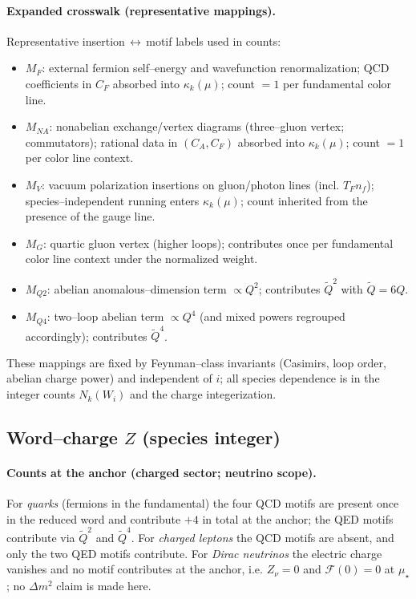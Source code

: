 \documentclass[epjc3]{svjour3}
\begin{document}
\paragraph{Expanded crosswalk (representative mappings).}
Representative insertion\,$\leftrightarrow$\,motif labels used in counts:
\begin{itemize}
  \item $M_F$: external fermion self--energy and wavefunction renormalization; QCD coefficients in $C_F$ absorbed into $\kappa_k(\mu)$; count $=1$ per fundamental color line.
  \item $M_{NA}$: nonabelian exchange/vertex diagrams (three--gluon vertex; commutators); rational data in $(C_A,C_F)$ absorbed into $\kappa_k(\mu)$; count $=1$ per color line context.
  \item $M_V$: vacuum polarization insertions on gluon/photon lines (incl. $T_F n_f$); species--independent running enters $\kappa_k(\mu)$; count inherited from the presence of the gauge line.
  \item $M_G$: quartic gluon vertex (higher loops); contributes once per fundamental color line context under the normalized weight.
  \item $M_{Q2}$: abelian anomalous--dimension term $\propto Q^2$; contributes $\tilde Q^2$ with $\tilde Q=6Q$.
  \item $M_{Q4}$: two--loop abelian term $\propto Q^4$ (and mixed powers regrouped accordingly); contributes $\tilde Q^4$.
\end{itemize}
These mappings are fixed by Feynman--class invariants (Casimirs, loop order, abelian charge power) and independent of $i$; all species dependence is in the integer counts $N_k(W_i)$ and the charge integerization.

\subsection{Word--charge $Z$ (species integer)}

\paragraph{Counts at the anchor (charged sector; neutrino scope).}
For \emph{quarks} (fermions in the fundamental) the four QCD motifs are present once in the reduced word and contribute $+4$ in total at the anchor; the QED motifs contribute via $\tilde Q^2$ and $\tilde Q^4$. For \emph{charged leptons} the QCD motifs are absent, and only the two QED motifs contribute. For \emph{Dirac neutrinos} the electric charge vanishes and no motif contributes at the anchor, i.e. $Z_\nu=0$ and $\mathcal F(0)=0$ at $\mu_\star$; no $\Delta m^2$ claim is made here.
\end{document}
